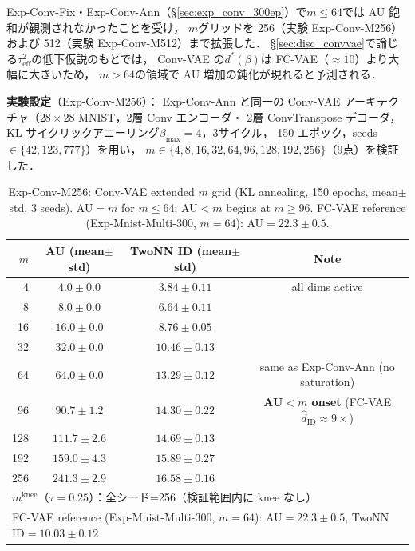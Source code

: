 \documentclass[11pt,a4paper]{jsarticle}
\newcommand{\mknee}{m^{\mathrm{knee}}}
\begin{document}
Exp-Conv-Fix・Exp-Conv-Ann（§\ref{sec:exp_conv_300ep}）で$m \leq 64$では AU 飽和が観測されなかったことを受け，
$m$グリッドを 256（実験 Exp-Conv-M256）および 512（実験 Exp-Conv-M512）まで拡張した．
§\ref{sec:disc_convvae}で論じる$\tau^2_\mathrm{eff}$の低下仮説のもとでは，
Conv-VAE の$d^*(\beta)$は FC-VAE（$\approx 10$）より大幅に大きいため，
$m>64$の領域で AU 増加の鈍化が現れると予測される．

\textbf{実験設定}（Exp-Conv-M256）：
Exp-Conv-Ann と同一の Conv-VAE アーキテクチャ（$28\times28$ MNIST，2層 Conv エンコーダ・
2層 ConvTranspose デコーダ，KL サイクリックアニーリング$\beta_\mathrm{max}=4$，3サイクル，
150 エポック，seeds$\in\{42,123,777\}$）を用い，
$m \in \{4, 8, 16, 32, 64, 96, 128, 192, 256\}$（9点）を検証した．

\begin{table}[H]
\centering
\caption{Exp-Conv-M256: Conv-VAE extended $m$ grid (KL annealing, 150 epochs, mean$\pm$std, 3 seeds). AU$=m$ for $m \leq 64$; AU$<m$ begins at $m \geq 96$. FC-VAE reference (Exp-Mnist-Multi-300, $m=64$): AU$=22.3\pm0.5$.}
\label{tab:en}
\small
\begin{tabular}{rccc}
\toprule
$m$ & AU (mean$\pm$std) & TwoNN ID (mean$\pm$std) & Note \\
\midrule
  4 & $4.0\pm0.0$   & $3.84\pm0.11$ & all dims active \\
  8 & $8.0\pm0.0$   & $6.64\pm0.11$ & \\
 16 & $16.0\pm0.0$  & $8.76\pm0.05$ & \\
 32 & $32.0\pm0.0$  & $10.46\pm0.13$ & \\
 64 & $64.0\pm0.0$  & $13.29\pm0.12$ & same as Exp-Conv-Ann (no saturation) \\
 96 & $\mathbf{90.7\pm1.2}$  & $14.30\pm0.22$ & \textbf{AU$<m$ onset} (FC-VAE $\hat{d}_\mathrm{ID} \approx 9\times$) \\
128 & $111.7\pm2.6$ & $14.69\pm0.13$ & \\
192 & $159.0\pm4.3$ & $15.89\pm0.27$ & \\
256 & $241.3\pm2.9$ & $16.58\pm0.16$ & \\
\midrule
\multicolumn{4}{l}{$\mknee$（$\tau=0.25$）：全シード=256（検証範囲内に knee なし）} \\
\multicolumn{4}{l}{FC-VAE reference (Exp-Mnist-Multi-300, $m=64$): AU$=22.3\pm0.5$, TwoNN ID$=10.03\pm0.12$} \\
\bottomrule
\end{tabular}
\end{table}
\end{document}
